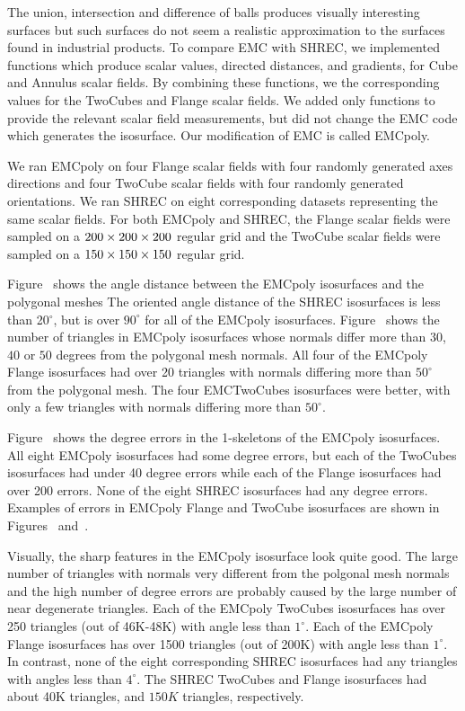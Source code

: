The union, intersection and difference of balls produces visually interesting surfaces
but such surfaces do not seem a realistic approximation to the surfaces found in industrial products.
To compare EMC with SHREC, we implemented functions which produce scalar values, directed distances,
and gradients, for Cube and Annulus scalar fields.
By combining these functions,
we the corresponding values for the TwoCubes and Flange scalar fields.
We added only functions to provide the relevant scalar field measurements,
but did not change the EMC code which generates the isosurface.
Our modification of EMC is called EMCpoly.

We ran EMCpoly on four Flange scalar fields 
with four randomly generated axes directions
and four TwoCube scalar fields with four randomly generated orientations.
We ran SHREC on eight corresponding datasets representing 
the same scalar fields.
For both EMCpoly and SHREC,
the Flange scalar fields were sampled on a $200 \times 200 \times 200$ regular grid
and the TwoCube scalar fields were sampled on a $150 \times 150 \times 150$ regular grid.

Figure~\protect{} shows the angle distance
between the EMCpoly isosurfaces and the polygonal meshes
The oriented angle distance of the SHREC isosurfaces is less than 20$^\circ$,
but is over $90^\circ$ for all of the EMCpoly isosurfaces.
Figure~\protect{} shows the
number of triangles in EMCpoly isosurfaces 
whose normals differ more than $30$, $40$ or $50$ degrees
from the polygonal mesh normals.
All four of the EMCpoly Flange isosurfaces had over 20 triangles
with normals differing more than $50^\circ$ from the polygonal mesh.
The four EMCTwoCubes isosurfaces were better,
with only a few triangles with normals differing more than $50^\circ$.

Figure~\protect{} shows the degree errors
in the 1-skeletons of the \mbox{EMCpoly} isosurfaces.
All eight EMCpoly isosurfaces had some degree errors,
but each of the TwoCubes isosurfaces had under 40 degree errors
while each of the Flange isosurfaces had over 200 errors.
None of the eight SHREC isosurfaces had any degree errors.
Examples of errors in EMCpoly Flange and TwoCube isosurfaces
are shown in Figures~ 
and~.

Visually, the sharp features in the EMCpoly isosurface look quite good.
The large number of triangles with normals very different from the polgonal
mesh normals and the high number of degree errors
are probably caused by the large number of near degenerate triangles.
Each of the EMCpoly TwoCubes isosurfaces has over 250 triangles
(out of 46K-48K)
with angle less than $1^\circ$.
Each of the EMCpoly Flange isosurfaces has over 1500 triangles
(out of 200K)
with angle less than $1^\circ$.
In contrast, none of the eight corresponding SHREC isosurfaces
had any triangles with angles less than $4^\circ$.
The SHREC TwoCubes and Flange isosurfaces had about 40K triangles,
and $150K$ triangles, respectively.

